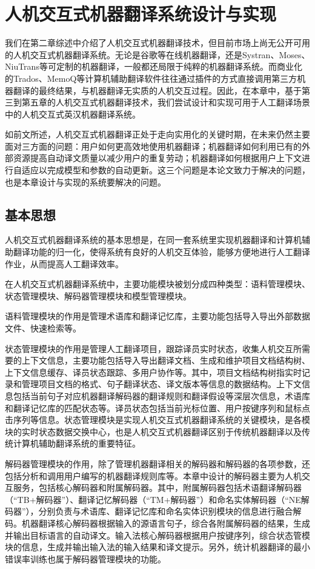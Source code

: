 
\chapter{人机交互式机器翻译系统设计与实现}
\label{Chapter_implementation}

我们在第二章综述中介绍了人机交互式机器翻译技术，但目前市场上尚无公开可用的人机交互式机器翻译系统。无论是谷歌等在线机器翻译，还是Systran、Moses、NiuTrans等可定制的机器翻译，一般都还局限于纯粹的机器翻译系统。而商业化的Trados、MemoQ等计算机辅助翻译软件往往通过插件的方式直接调用第三方机器翻译的最终结果，与机器翻译无实质的人机交互过程。因此，在本章中，基于第三到第五章的人机交互式机器翻译技术，我们尝试设计和实现可用于人工翻译场景中的人机交互式英汉机器翻译系统。

如前文所述，人机交互式机器翻译正处于走向实用化的关键时期，在未来仍然主要面对三方面的问题：用户如何更高效地使用机器翻译；机器翻译如何利用已有的外部资源提高自动译文质量以减少用户的重复劳动；机器翻译如何根据用户上下文进行自适应以完成模型和参数的自动更新。这三个问题是本论文致力于解决的问题，也是本章设计与实现的系统要解决的问题。

\section{基本思想}

人机交互式机器翻译系统的基本思想是，在同一套系统里实现机器翻译和计算机辅助翻译功能的归一化，使得系统有良好的人机交互体验，能够方便地进行人工翻译作业，从而提高人工翻译效率。

在人机交互式机器翻译系统中，主要功能模块被划分成四种类型：语料管理模块、状态管理模块、解码器管理模块和模型管理模块。

语料管理模块的作用是管理术语库和翻译记忆库，主要功能包括导入导出外部数据文件、快速检索等。

状态管理模块的作用是管理人工翻译项目，跟踪译员实时状态，收集人机交互所需要的上下文信息，主要功能包括导入导出翻译文档、生成和维护项目文档结构树、上下文信息缓存、译员状态跟踪、多用户协作等。其中，项目文档结构树指实时记录和管理项目文档的格式、句子翻译状态、译文版本等信息的数据结构。上下文信息包括当前句子对应机器翻译解码器的翻译规则和翻译假设等深层次信息，术语库和翻译记忆库的匹配状态等。译员状态包括当前光标位置、用户按键序列和鼠标点击序列等信息。状态管理模块是实现人机交互式机器翻译系统的关键模块，是各模块的实时状态数据交换中心，也是人机交互式机器翻译区别于传统机器翻译以及传统计算机辅助翻译系统的重要特征。

解码器管理模块的作用，除了管理机器翻译相关的解码器和解码器的各项参数，还包括分析和调用用户编写的机器翻译规则库等。本章中设计的解码器主要为人机交互服务，包括核心解码器和附属解码器。其中，附属解码器包括术语翻译解码器（“TB+解码器”）、翻译记忆解码器（“TM+解码器”）和命名实体解码器（“NE解码器”），分别负责与术语库、翻译记忆库和命名实体识别模块的信息进行融合解码。机器翻译核心解码器根据输入的源语言句子，综合各附属解码器的结果，生成并输出目标语言的自动译文。输入法核心解码器根据用户按键序列，综合状态管模块的信息，生成并输出输入法的输入结果和译文提示。另外，统计机器翻译的最小错误率训练也属于解码器管理模块的功能。

